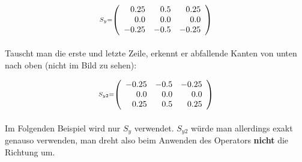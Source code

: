 \documentclass[11pt]{article}
\begin{document}
    \[\scriptstyle S_y =  \def\g{\color{lightgray}}\left(\begin{array}{rrr}0.25 & 0.5 & 0.25\\0.0 & 0.0 & 0.0\\-0.25 & -0.5 & -0.25\end{array}\right)\]
    
    \paragraph{}
    Tauscht man die erste und letzte Zeile, erkennt er abfallende Kanten von unten nach oben (nicht im Bild zu sehen):
    
    \[\scriptstyle S_{y2} =  \def\g{\color{lightgray}}\left(\begin{array}{rrr}-0.25 & -0.5 & -0.25\\0.0 & 0.0 & 0.0\\0.25 & 0.5 & 0.25\end{array}\right)\]
    
    \paragraph{}
    Im Folgenden Beispiel wird nur $S_y$ verwendet. $S_{y2}$ würde man allerdings exakt genauso verwenden, man dreht also beim Anwenden des Operators \textbf{nicht} die Richtung um.
    
\end{document}
